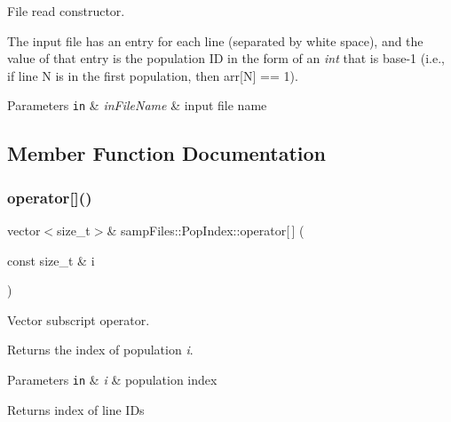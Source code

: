 File read constructor. 

The input file has an entry for each line (separated by white space), and the value of that entry is the population ID in the form of an {\itshape int} that is base-\/1 (i.\+e., if line N is in the first population, then {\ttfamily arr\mbox{[}N\mbox{]} == 1}).


\begin{DoxyParams}[1]{Parameters}
\mbox{\tt in}  & {\em in\+File\+Name} & input file name \\
\hline
\end{DoxyParams}


\subsection{Member Function Documentation}
\mbox{\label{classsamp_files_1_1_pop_index_ad3e3ff5964bea3b17bf54c2fc3af231c}} 
\subsubsection{\texorpdfstring{operator[]()}{operator[]()}\hspace{0.1cm}{\footnotesize\ttfamily [1/2]}}
{\footnotesize\ttfamily vector$<$size\+\_\+t$>$\& samp\+Files\+::\+Pop\+Index\+::operator\mbox{[}$\,$\mbox{]} (\begin{DoxyParamCaption}\item[{const size\+\_\+t \&}]{i }\end{DoxyParamCaption})\hspace{0.3cm}{\ttfamily [inline]}}



Vector subscript operator. 

Returns the index of population {\itshape i}.


\begin{DoxyParams}[1]{Parameters}
\mbox{\tt in}  & {\em i} & population index \\
\hline
\end{DoxyParams}
\begin{DoxyReturn}{Returns}
index of line I\+Ds 
\end{DoxyReturn}
\mbox{\label{classsamp_files_1_1_pop_index_a56dea775828fc2a6b8b5b110429f67a5}} 

